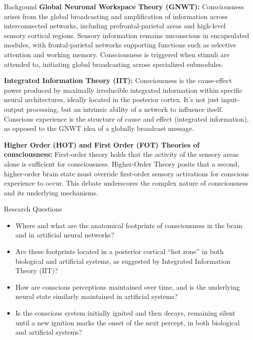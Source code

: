 \documentclass[final]{beamer}
\newlength{\colwidth}
\begin{document}
\begin{frame}[t]
\begin{columns}[t]
\begin{column}{\colwidth}
  \begin{block}{Backgound}
      \textbf{Global Neuronal Workspace Theory (GNWT):} Consciousness arises from the global broadcasting and amplification of information across interconnected networks, including prefrontal-parietal areas and high-level sensory cortical regions. Sensory information remains unconscious in encapsulated modules, with frontal-parietal networks supporting functions such as selective attention and working memory. Consciousness is triggered when stimuli are attended to, initiating global broadcasting across specialized submodules.

      \textbf{Integrated Information Theory (IIT):} Consciousness is the cause-effect power produced by maximally irreducible integrated information within specific neural architectures, ideally located in the posterior cortex. It's not just input-output processing, but an intrinsic ability of a network to influence itself. Conscious experience is the structure of cause and effect (integrated information), as opposed to the GNWT idea of a globally broadcast message.

      \textbf{Higher Order (HOT) and First Order (FOT) Theories of consciousness:} First-order theory holds that the activity of the sensory areas alone is sufficient for consciousness. Higher-Order Theory posits that a second, higher-order brain state must override first-order sensory activations for conscious experience to occur. This debate underscores the complex nature of consciousness and its underlying mechanisms.
  \end{block}

  \begin{alertblock}{Research Questions}
   \begin{itemize}
       \item Where and what are the anatomical footprints of consciousness in the brain and in artificial neural networks?
       \item Are these footprints located in a posterior cortical “hot zone” in both biological and artificial systems, as suggested by Integrated Information Theory (IIT)?
       \item How are conscious perceptions maintained over time, and is the underlying neural state similarly maintained in artificial systems?
       \item Is the conscious system initially ignited and then decays, remaining silent until a new ignition marks the onset of the next percept, in both biological and artificial systems?
    \end{itemize}
  \end{alertblock}


\end{column}
\end{columns}
\end{frame}
\end{document}
